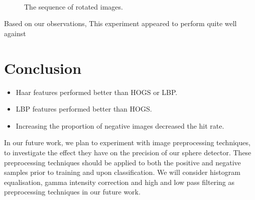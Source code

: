 \documentclass{llncs}
\begin{document}
{		\begin{figure}
			\centering
			 \\
			\vspace{0.1cm}
			 \\
			\vspace{0.1cm}
			 \\
			\caption{The sequence of rotated images.}
			\label{fig:rotated_sequence}
		\end{figure}


		Based on our observations,
		This experiment appeared to perform quite well against

	}

	\section{Conclusion} {
	\label{sec:conclusion}

		\begin{itemize}
			\item Haar features performed better than HOGS or LBP.
			\item LBP features performed better than HOGS.
			\item Increasing the proportion of negative images decreased the hit rate.
		\end{itemize}

		In our future work, we plan to experiment with image preprocessing techniques, to investigate the effect they have on the precision of our sphere detector. These preprocessing techniques should be applied to both the positive and negative samples prior to training and upon classification. We will consider histogram equalisation, gamma intensity correction and high and low pass filtering \citep{gross2003image} as preprocessing techniques in our future work.

	}

	
	
\end{document}
